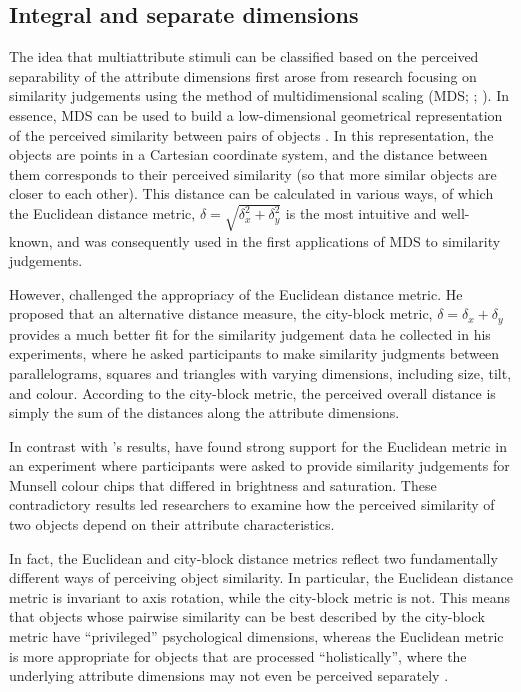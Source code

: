 \documentclass[11pt,a4paper]{article}
\begin{document}
\subsection{Integral and separate dimensions} 

The idea that multiattribute stimuli can be classified based on the perceived separability of the attribute dimensions first arose from research focusing on similarity judgements using the method of multidimensional scaling (MDS; ; ). In essence, MDS can be used to build a low-dimensional geometrical representation of the perceived similarity between pairs of objects \cite{Hout2013}. In this representation, the objects are points in a Cartesian coordinate system, and the distance between them corresponds to their perceived similarity (so that more similar objects are closer to each other). This distance can be calculated in various ways, of which the Euclidean distance metric, $\delta = \sqrt{\delta_x^2 + \delta_y^2} $ is the most intuitive and well-known, and was consequently used in the first applications of MDS to similarity judgements.

However,  challenged the appropriacy of the Euclidean distance metric. He proposed that an alternative distance measure, the city-block metric, $\delta = \delta_x + \delta_y $ provides a much better fit for the similarity judgement data he collected in his experiments, where he asked participants to make similarity judgments between parallelograms, squares and triangles with varying dimensions, including size, tilt, and colour. According to the city-block metric, the perceived overall distance is simply the sum of the distances along the attribute dimensions.  

In contrast with \citeauthor{Attneave1950}'s results,  have found strong support for the Euclidean metric in an experiment where participants were asked to provide similarity judgements for Munsell colour chips that differed in brightness and saturation. These contradictory results led researchers to examine how the perceived similarity of two objects depend on their attribute characteristics. 

In fact, the Euclidean and city-block distance metrics reflect two fundamentally different ways of perceiving object similarity. In particular, the Euclidean distance metric is invariant to axis rotation, while the city-block metric is not. This means that objects whose pairwise similarity can be best described by the city-block metric have ``privileged'' psychological dimensions, whereas the Euclidean metric is more appropriate for objects that are processed ``holistically'', where the underlying attribute dimensions may not even be perceived separately \cite{Shepp1989}. 
\end{document}

